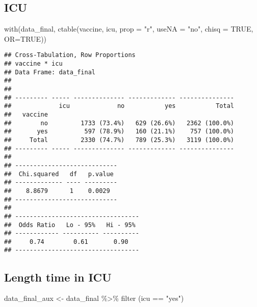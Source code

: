 \documentclass[
]{article}
\newenvironment{Shaded}{\begin{snugshade}}{\end{snugshade}}
\newcommand{\AttributeTok}[1]{\textcolor[rgb]{0.77,0.63,0.00}{#1}}
\newcommand{\ConstantTok}[1]{\textcolor[rgb]{0.00,0.00,0.00}{#1}}
\newcommand{\FunctionTok}[1]{\textcolor[rgb]{0.00,0.00,0.00}{#1}}
\newcommand{\NormalTok}[1]{#1}
\newcommand{\OtherTok}[1]{\textcolor[rgb]{0.56,0.35,0.01}{#1}}
\newcommand{\SpecialCharTok}[1]{\textcolor[rgb]{0.00,0.00,0.00}{#1}}
\newcommand{\StringTok}[1]{\textcolor[rgb]{0.31,0.60,0.02}{#1}}
\begin{document}
\hypertarget{icu}{%
\subsection{ICU}\label{icu}}

\begin{Shaded}
\begin{Highlighting}[]
\FunctionTok{with}\NormalTok{(data\_final, }\FunctionTok{ctable}\NormalTok{(vaccine, icu, }\AttributeTok{prop =} \StringTok{"r"}\NormalTok{, }\AttributeTok{useNA =} \StringTok{"no"}\NormalTok{, }\AttributeTok{chisq =} \ConstantTok{TRUE}\NormalTok{, }\AttributeTok{OR=}\ConstantTok{TRUE}\NormalTok{))}
\end{Highlighting}
\end{Shaded}

\begin{verbatim}
## Cross-Tabulation, Row Proportions  
## vaccine * icu  
## Data Frame: data_final  
## 
## 
## --------- ----- -------------- ------------- ---------------
##             icu             no           yes           Total
##   vaccine                                                   
##        no         1733 (73.4%)   629 (26.6%)   2362 (100.0%)
##       yes          597 (78.9%)   160 (21.1%)    757 (100.0%)
##     Total         2330 (74.7%)   789 (25.3%)   3119 (100.0%)
## --------- ----- -------------- ------------- ---------------
## 
## ----------------------------
##  Chi.squared   df   p.value 
## ------------- ---- ---------
##    8.8679      1    0.0029  
## ----------------------------
## 
## ----------------------------------
##  Odds Ratio   Lo - 95%   Hi - 95% 
## ------------ ---------- ----------
##     0.74        0.61       0.90   
## ----------------------------------
\end{verbatim}

\hypertarget{length-time-in-icu}{%
\subsection{Length time in ICU}\label{length-time-in-icu}}

\begin{Shaded}
\begin{Highlighting}[]
\NormalTok{data\_final\_aux }\OtherTok{\textless{}{-}}\NormalTok{ data\_final }\SpecialCharTok{\%\textgreater{}\%} 
  \FunctionTok{filter}\NormalTok{ (icu }\SpecialCharTok{==} \StringTok{"yes"}\NormalTok{)}
\end{Highlighting}
\end{Shaded}
\end{document}
